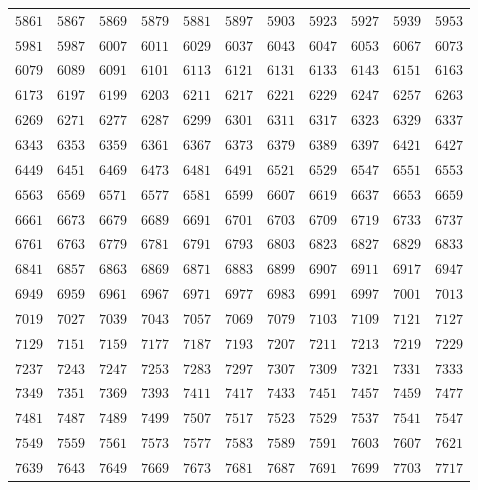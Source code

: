\begin{table}[h!]
{\begin{tabular}{|c|c|c|c|c|c|c|c|c|c|c|}
$5861$ & $5867$ & $5869$ & $5879$ & $5881$ & $5897$ & $5903$ & $5923$ & $5927$ & $5939$ & $5953$ \\
$5981$ & $5987$ & $6007$ & $6011$ & $6029$ & $6037$ & $6043$ & $6047$ & $6053$ & $6067$ & $6073$ \\
$6079$ & $6089$ & $6091$ & $6101$ & $6113$ & $6121$ & $6131$ & $6133$ & $6143$ & $6151$ & $6163$ \\
$6173$ & $6197$ & $6199$ & $6203$ & $6211$ & $6217$ & $6221$ & $6229$ & $6247$ & $6257$ & $6263$ \\
$6269$ & $6271$ & $6277$ & $6287$ & $6299$ & $6301$ & $6311$ & $6317$ & $6323$ & $6329$ & $6337$ \\
$6343$ & $6353$ & $6359$ & $6361$ & $6367$ & $6373$ & $6379$ & $6389$ & $6397$ & $6421$ & $6427$ \\
$6449$ & $6451$ & $6469$ & $6473$ & $6481$ & $6491$ & $6521$ & $6529$ & $6547$ & $6551$ & $6553$ \\
$6563$ & $6569$ & $6571$ & $6577$ & $6581$ & $6599$ & $6607$ & $6619$ & $6637$ & $6653$ & $6659$ \\
$6661$ & $6673$ & $6679$ & $6689$ & $6691$ & $6701$ & $6703$ & $6709$ & $6719$ & $6733$ & $6737$ \\
$6761$ & $6763$ & $6779$ & $6781$ & $6791$ & $6793$ & $6803$ & $6823$ & $6827$ & $6829$ & $6833$ \\
$6841$ & $6857$ & $6863$ & $6869$ & $6871$ & $6883$ & $6899$ & $6907$ & $6911$ & $6917$ & $6947$ \\
$6949$ & $6959$ & $6961$ & $6967$ & $6971$ & $6977$ & $6983$ & $6991$ & $6997$ & $7001$ & $7013$ \\
$7019$ & $7027$ & $7039$ & $7043$ & $7057$ & $7069$ & $7079$ & $7103$ & $7109$ & $7121$ & $7127$ \\
$7129$ & $7151$ & $7159$ & $7177$ & $7187$ & $7193$ & $7207$ & $7211$ & $7213$ & $7219$ & $7229$ \\
$7237$ & $7243$ & $7247$ & $7253$ & $7283$ & $7297$ & $7307$ & $7309$ & $7321$ & $7331$ & $7333$ \\
$7349$ & $7351$ & $7369$ & $7393$ & $7411$ & $7417$ & $7433$ & $7451$ & $7457$ & $7459$ & $7477$ \\
$7481$ & $7487$ & $7489$ & $7499$ & $7507$ & $7517$ & $7523$ & $7529$ & $7537$ & $7541$ & $7547$ \\
$7549$ & $7559$ & $7561$ & $7573$ & $7577$ & $7583$ & $7589$ & $7591$ & $7603$ & $7607$ & $7621$ \\
$7639$ & $7643$ & $7649$ & $7669$ & $7673$ & $7681$ & $7687$ & $7691$ & $7699$ & $7703$ & $7717$ \\

\end{tabular}}
\end{table}
